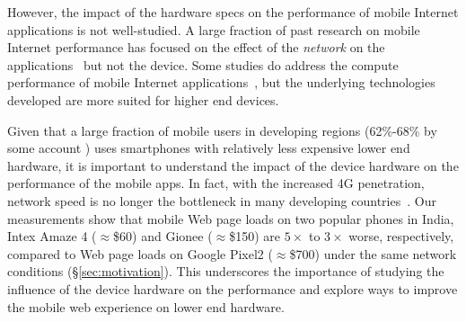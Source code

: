 However, the impact of the hardware specs
on the performance of mobile Internet applications is not well-studied. A large fraction of past research on mobile Internet performance has focused on the effect of the {\em network} on the applications~\cite{butkiewicz2015klotski, kelton2017improving, singh2015flexiweb, Ruamviboonsuk:2017:VAM:3098822.3098851, Shafiqund, Xiaodash2m, chen2016effective} but not 
the device. Some studies do address the compute performance of mobile Internet applications~\cite{zhu2017optimizing,jones2009parallelizing,mai2012case}, but the underlying
technologies developed are more suited for higher end devices. 

Given that a large fraction of mobile
users in developing regions (62\%-68\% by some 
account \cite{unity}) uses smartphones with relatively
less expensive lower end hardware, it is important
to understand the impact of the device hardware on the 
performance of the mobile apps. In fact, with the increased 4G penetration, network speed is no longer the bottleneck in many developing countries~\cite{mobilephones,contreras2017patents,jioplans1,jioplans2}.  Our measurements show that mobile Web page loads on two popular phones in India, Intex Amaze 4 ($\approx$\$60) and Gionee ($\approx$\$150) are $5\times$ to $3\times$ worse, respectively, compared to Web page loads on Google Pixel2 ($\approx$\$700) under the same network conditions (\S\ref{sec:motivation}). 
This underscores the importance of studying the influence of the device hardware
on the performance and explore ways to improve the mobile web experience on lower end hardware. 

